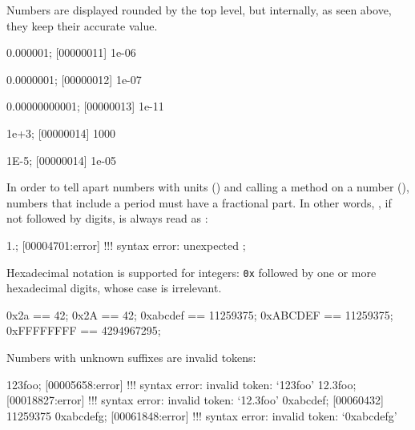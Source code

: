 Numbers are displayed rounded by the top level, but internally, as
seen above, they keep their accurate value.

\begin{urbiscript}
0.000001;
[00000011] 1e-06

0.0000001;
[00000012] 1e-07

0.00000000001;
[00000013] 1e-11

1e+3;
[00000014] 1000

1E-5;
[00000014] 1e-05
\end{urbiscript}

In order to tell apart numbers with units () and calling a method
on a number (), numbers that include a period must have a
fractional part.  In other words, , if not followed by digits, is
always read as :

\begin{urbiscript}
1.;
[00004701:error] !!! syntax error: unexpected ;
\end{urbiscript}

Hexadecimal notation is supported for integers: \lstinline|0x| followed by
one or more hexadecimal digits, whose case is irrelevant.

\begin{urbiassert}
      0x2a == 42;
      0x2A == 42;
  0xabcdef == 11259375;
  0xABCDEF == 11259375;
0xFFFFFFFF == 4294967295;
\end{urbiassert}

Numbers with unknown suffixes are invalid tokens:

\begin{urbiscript}
123foo;
[00005658:error] !!! syntax error: invalid token: `123foo'
12.3foo;
[00018827:error] !!! syntax error: invalid token: `12.3foo'
0xabcdef;
[00060432] 11259375
0xabcdefg;
[00061848:error] !!! syntax error: invalid token: `0xabcdefg'
\end{urbiscript}

